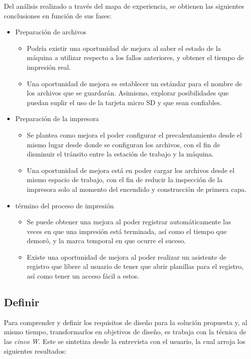 Del análisis realizado a través del mapa de experiencia, se obtienen las siguientes conclusiones en función de sus fases:

\begin{itemize}
\item Preparación de archivos
\begin{itemize}
\item Podría existir una oportunidad de mejora al saber el estado de la máquina a utilizar respecto a los fallos anteriores, y obtener el tiempo de impresión real.
\item Una oportunidad de mejora es establecer un estándar para el nombre de los archivos que se guardarán. Asimismo, explorar posibilidades que puedan suplir el uso de la tarjeta micro SD y que sean confiables.
\end{itemize}
\item Preparación de la impresora
\begin{itemize}
\item Se plantea como mejora el poder configurar el precalentamiento desde el mismo lugar desde donde se configuran los archivos, con el fin de disminuir el tránsito entre la estación de trabajo y la máquina.
\item Una oportunidad de mejora está en poder cargar los archivos desde el mismo espacio de trabajo, con el fin de reducir la inspección de la impresora solo al momento del encendido y construcción de primera capa.
\end{itemize}
\item término del proceso de impresión
\begin{itemize}
\item Se puede obtener una mejora al poder registrar automáticamente las veces en que una impresión está terminada, así como el tiempo que demoró, y la marca temporal en que ocurre el suceso.
\item Existe una oportunidad de mejora al poder realizar un asistente de registro que libere al usuario de tener que abrir planillas para el registro, así como tener un acceso fácil a estos. 
\end{itemize}
\end{itemize}

\subsection{Definir}
Para comprender y definir los requisitos de diseño para la solución propuesta y, al mismo tiempo, transformarlos en objetivos de diseño, es trabaja con la técnica de las \textit{cinco W}. Este se sintetiza desde la entrevista con el usuario, la cual arroja los siguientes resultados:


